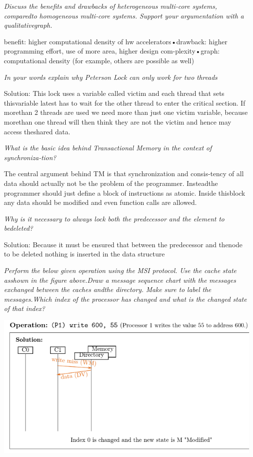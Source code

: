 \documentclass[fontsize=8pt]{scrartcl}
\begin{document}
\begin{multicols*}{4}
\textit{Discuss the benefits and drawbacks of heterogeneous multi-core systems, comparedto homogeneous multi-core systems. Support your argumentation with a qualitativegraph.}

benefit: higher computational density of hw accelerators•drawback: higher programming effort, use of more area, higher design com-plexity•graph: computational density (for example, others are possible as well)

\textit{In your words explain why Peterson Lock can only work for two threads}

Solution: This lock uses a variable called victim and each thread that sets thisvariable latest has to wait for the other thread to enter the critical section. If morethan 2 threads are used we need more than just one victim variable, because morethan one thread will then think they are not the victim and hence may access theshared data.

\textit{What is the basic idea behind Transactional Memory in the context of synchroniza-tion?}

The central argument behind TM is that synchronization and consis-tency of all data should actually not be the problem of the programmer. Insteadthe programmer should just define a block of instructions as atomic. Inside thisblock any data should be modified and even function calls are allowed.

\textit{Why is it necessary to always lock both the predecessor and the element to bedeleted?}

Solution: Because it must be ensured that between the predecessor and thenode to be deleted nothing is inserted in the data structure

\textit{Perform the below given operation using the MSI protocol. Use the cache state asshown in the figure above.Draw a message sequence chart with the messages exchanged between the caches andthe directory. Make sure to label the messages.Which index of the processor has changed and what is the changed state of that index?}

\begin{center}
  \centering
  \includegraphics[width=0.8\linewidth]{img/mseqchart.png}
  \label{fig:mseqchart}
\end{center}


\end{multicols*}
\end{document}
